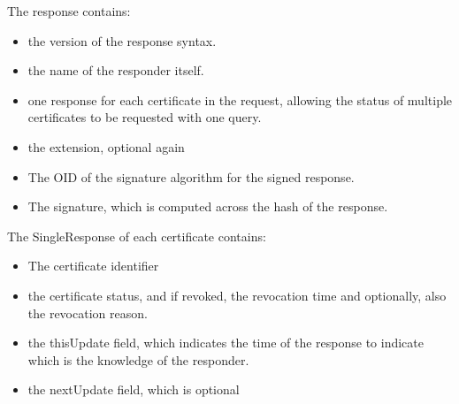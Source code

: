 The response contains:
\begin{itemize}
    \item the version of the response syntax.
    \item the name of the responder itself.
    \item one response for each certificate in the request, allowing
      the status of multiple certificates to be requested with one
      query.
    \item the extension, optional again
    \item The OID of the signature algorithm for the signed response.
    \item The signature, which is computed across the hash of the 
          response.
\end{itemize}
The SingleResponse of each certificate contains:
\begin{itemize}
  \item The certificate identifier
  \item the certificate status, and if revoked, the revocation time
    and optionally, also the revocation reason.
  \item the thisUpdate field, which indicates the time of the response
    to indicate which is the knowledge of the responder.
  \item the nextUpdate field, which is optional
\end{itemize}

